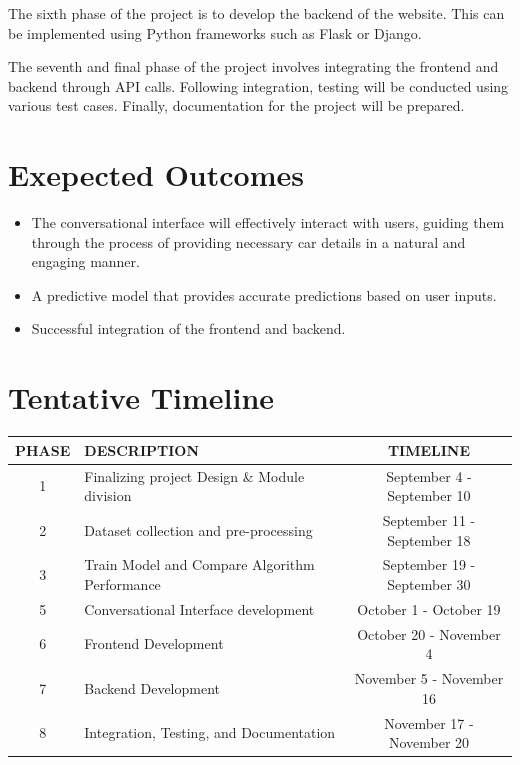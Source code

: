 \documentclass[a4paper,12pt]{article}
\begin{document}
\begin{justify}
The sixth phase of the project is to develop the backend of the website. This can be implemented using Python frameworks such as Flask or Django.
\newline

The seventh and final phase of the project involves integrating the frontend and backend through API calls. Following integration, testing will be conducted using various test cases. Finally, documentation for the project will be prepared.

\newpage
\section*{Exepected Outcomes}
	\begin{itemize}
		\item The conversational interface will effectively interact with users, guiding them through the process of providing necessary car details in a natural and engaging manner.
		\item A predictive model that provides accurate predictions based on user inputs.
		\item Successful integration of the frontend and backend.

	 \end{itemize}

\section*{Tentative Timeline}
\begin{tabular}{|c|p{7cm}|c|}
\hline
\textbf{PHASE} & \textbf{DESCRIPTION} & \textbf{TIMELINE} \\ \hline
1 & Finalizing project Design \& Module division & September 4 - September 10 \\ \hline
2 & Dataset collection and pre-processing & September 11 - September 18 \\ \hline
3 & Train Model and Compare Algorithm Performance & September 19 - September 30 \\ \hline
5 & Conversational Interface development & October 1 - October 19 \\ \hline
6 & Frontend Development & October 20 - November 4 \\ \hline
7 & Backend Development & November 5 - November 16 \\ \hline
8 & Integration, Testing, and Documentation & November 17 - November 20 \\ \hline
\end{tabular}



\end{justify}
\end{document}
